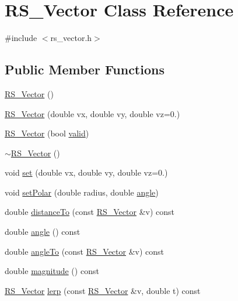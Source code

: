 \hypertarget{class_r_s___vector}{\section{R\-S\-\_\-\-Vector Class Reference}
\label{class_r_s___vector}
}


{\ttfamily \#include $<$rs\-\_\-vector.\-h$>$}

\subsection*{Public Member Functions}
\begin{DoxyCompactItemize}
\item 
\hyperlink{class_r_s___vector_aeb0f0df770b60e94c8ab65304749943f}{R\-S\-\_\-\-Vector} ()
\item 
\hyperlink{class_r_s___vector_a48ba2b83dc071d8c779d2e3d3ae6b3a2}{R\-S\-\_\-\-Vector} (double vx, double vy, double vz=0.)
\item 
\hyperlink{class_r_s___vector_a0bc31448ae9fc7f5e8ab41a86fe41e89}{R\-S\-\_\-\-Vector} (bool \hyperlink{class_r_s___vector_a218a279eef9451516eb2f35473471f06}{valid})
\item 
\hyperlink{class_r_s___vector_ac84e1fb6316457064342312fe232caa7}{$\sim$\-R\-S\-\_\-\-Vector} ()
\item 
void \hyperlink{class_r_s___vector_ab83aa1475e39334092f1fe5043905787}{set} (double vx, double vy, double vz=0.)
\item 
void \hyperlink{class_r_s___vector_a97ca1b03bb2c3738cec5b86575ef6bf5}{set\-Polar} (double radius, double \hyperlink{class_r_s___vector_a7fd6801a576580f279353d0fd9d40313}{angle})
\item 
double \hyperlink{class_r_s___vector_ac6e5c85479562f7affae3084db96b155}{distance\-To} (const \hyperlink{class_r_s___vector}{R\-S\-\_\-\-Vector} \&v) const 
\item 
double \hyperlink{class_r_s___vector_a7fd6801a576580f279353d0fd9d40313}{angle} () const 
\item 
double \hyperlink{class_r_s___vector_adc2b3700e0310cd24e38824d890979f1}{angle\-To} (const \hyperlink{class_r_s___vector}{R\-S\-\_\-\-Vector} \&v) const 
\item 
double \hyperlink{class_r_s___vector_a641f6f702e187ff7473fbe48af9a01aa}{magnitude} () const 
\item 
\hyperlink{class_r_s___vector}{R\-S\-\_\-\-Vector} \hyperlink{class_r_s___vector_af16d3508d470f965c0cc5f48e306e7c1}{lerp} (const \hyperlink{class_r_s___vector}{R\-S\-\_\-\-Vector} \&v, double t) const 

\end{DoxyCompactItemize}

